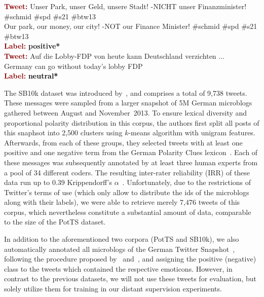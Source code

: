 \begin{example}\label{snt:cgsa:exmp:anno2}
  \noindent\textup{\bfseries\textcolor{darkred}{Tweet:}} {\upshape Unser Park, unser Geld, unsere Stadt! -NICHT unser Finanzminister! \smiley{} \#schmid \#spd \#s21 \#btw13}\\
  \noindent Our park, our money, our city! -NOT our Finance Minister! \smiley{} \#schmid \#spd \#s21 \#btw13\\
  \noindent\textup{\bfseries\textcolor{darkred}{Label:}}\hspace*{2em}\textbf{%
    \upshape\textcolor{green3}{positive*}}\\[1.5em]
  \noindent\textup{\bfseries\textcolor{darkred}{Tweet:}} {\upshape Auf die Lobby-FDP von heute kann Deutschland verzichten ...}\\
  \noindent Germany can go without today's lobby FDP\\
  \noindent\textup{\bfseries\textcolor{darkred}{Label:}}\hspace*{2em}\textbf{%
    \upshape\textcolor{black}{neutral*}}
\end{example}

The SB10k dataset was introduced by~\citet{Cieliebak:17}, and
comprises a total of 9,738 tweets.  These messages were sampled from a
larger snapshot of 5M German microblogs gathered between August and
November~2013.  To ensure lexical diversity and proportional polarity
distribution in this corpus, the authors first split all posts of this
snaphsot into 2,500 clusters using $k$-means algorithm with unigram
features.  Afterwards, from each of these groups, they selected tweets
with at least one positive and one negative term from the German
Polarity Clues lexicon~\cite{Waltinger:10}.  Each of these messages
was subsequently annotated by at least three human experts from a pool
of 34 different coders.  The resulting inter-rater reliability (IRR)
of these data run up to 0.39 Krippendorff's
$\alpha$~\cite{Krippendorff:07}.  Unfortunately, due to the
restrictions of Twitter's terms of use (which only allow to distribute
the ids of the microblogs along with their labels), we were able to
retrieve merely 7,476 tweets of this corpus, which nevertheless
constitute a substantial amount of data, comparable to the size of the
PotTS dataset.

In addition to the aforementioned two corpora (PotTS and SB10k), we
also automatically annotated all microblogs of the German Twitter
Snapshot~\cite{Scheffler:14}, following the procedure proposed
by~\citet{Read:05} and~\citet{Go:09}, and assigning the positive
(negative) class to the tweets which contained the respective
emoticons.  However, in contrast to the previous datasets, we will not
use these tweets for evaluation, but solely utilize them for training
in our distant supervision experiments.

